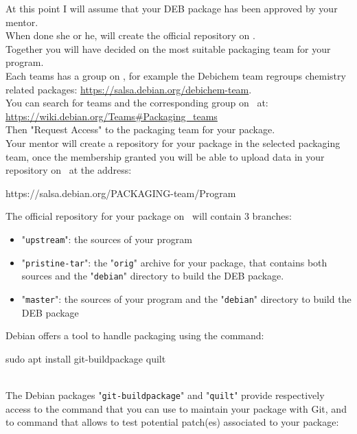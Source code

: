 At this point I will assume that your DEB package has been approved by your mentor. \\
When done she or he, will create the official repository on \salsa. \\ 
Together you will have decided on the most suitable packaging team for your program. \\ 
Each teams has a group on \salsa, for example the Debichem team  
regroups chemistry related packages: \href{https://salsa.debian.org/debichem-team}{https://salsa.debian.org/debichem-team}. \\[0.25cm]
You can search for teams and the corresponding group on \salsa\ at: \\[0.25cm]
\href{https://wiki.debian.org/Teams\#Packaging\_teams}{https://wiki.debian.org/Teams\#Packaging\_teams} \\[0.25cm]
Then "Request Access" to the packaging team for your package. \\[0.25cm]
Your mentor will create a repository for your package in the selected packaging team, once the membership granted you will be able 
to upload data in your repository on \salsa\ at the address:
\begin{center}https://salsa.debian.org/PACKAGING-team/Program\end{center}
The official repository for your package on \salsa\ will contain 3 branches:
\begin{itemize}
\item "\texttt{upstream}": the sources of your program
\item "\texttt{pristine-tar}": the "\texttt{orig}" archive for your package, that contains both sources and the "\texttt{debian}" directory to build the DEB package. 
\item "\texttt{master}": the sources of your program and the "\texttt{debian}" directory to build the DEB package
\end{itemize}
Debian offers a tool to handle packaging using the  command:
\begin{script}
\uprompt{~} sudo apt install git-buildpackage quilt
\end{script}\\[-0.5cm]
\noindent The Debian packages "\texttt{git-buildpackage}" and "\texttt{quilt}" provide respectively access to the  command that you can use to maintain your package with Git,
and to  command that allows to test potential patch(es) associated to your package:
